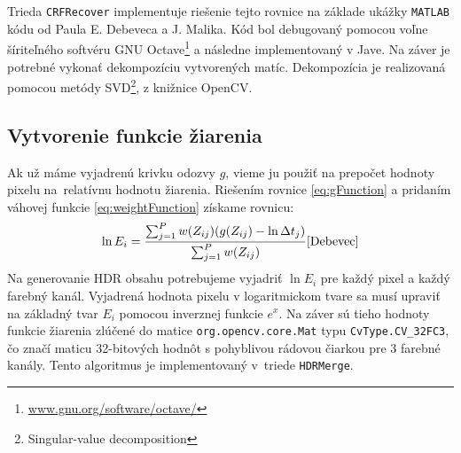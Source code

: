 Trieda \texttt{CRFRecover} implementuje riešenie tejto rovnice na základe ukážky \texttt{MATLAB} kódu od Paula
E. Debeveca a J. Malika\cite{Debevec}. Kód bol
debugovaný pomocou voľne šíriteľného softvéru GNU Octave\footnote{\url{www.gnu.org/software/octave/}}
a následne implementovaný v Jave. Na záver je potrebné vykonať dekompozíciu vytvorených matíc. Dekompozícia
je realizovaná pomocou metódy SVD\footnote{Singular-value decomposition},
z knižnice OpenCV.

\subsection{Vytvorenie funkcie žiarenia}

Ak už máme vyjadrenú krivku odozvy $g$, vieme ju použiť na prepočet hodnoty pixelu na~relatívnu hodnotu žiarenia.
Riešením rovnice \ref{eq:gFunction} a pridaním váhovej funkcie \ref{eq:weightFunction} získame rovnicu:
\begin{equation}
    \ln E_{i} = 
    \frac{
        \sum_{j=1}^{P}
        w(Z_{ij})(g(Z_{ij}) - \ln \Delta t_{j})
    }{
        \sum_{j=1}^{P}
        w(Z_{ij})
    }
    \cite{Debevec}
\end{equation}
Na generovanie HDR obsahu potrebujeme vyjadriť $\ln E_{i}$ pre každý pixel a každý farebný kanál. Vyjadrená
hodnota pixelu v logaritmickom tvare sa musí upraviť na základný tvar $E_{i}$ pomocou inverznej funkcie
$e^{x}$. Na záver sú tieho hodnoty funkcie žiarenia zlúčené do matice \texttt{org.opencv.core.Mat} typu
\texttt{CvType.CV\_32FC3}, čo značí maticu 32-bitových hodnôt s pohyblivou rádovou čiarkou pre 3 farebné kanály.
Tento algoritmus je implementovaný v~triede \texttt{HDRMerge}.
